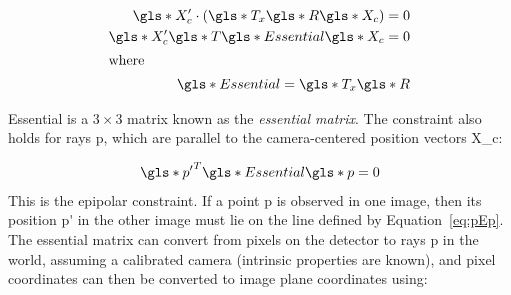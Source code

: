 \documentclass{osa-article}
\begin{document}
\begin{align}
  \gls*{X_c'} \cdot (\gls*{T_x} \gls*{R}\gls*{X_c}) = 0 \\
  \gls*{X_c'} \gls*{T} \gls*{Essential} \gls*{X_c}= 0   \\
  \intertext{where}
  \gls*{Essential} = \gls*{T_x} \gls*{R}
\end{align}

\gls*{Essential} is a \(3 \times 3\) matrix known as the \emph{essential matrix}.
The constraint also holds for rays \gls*{p}, which are parallel to the camera-centered position vectors \gls*{X_c}:

\begin{align}
  \gls*{p'}^T \gls*{Essential} \gls*{p} = 0 \label{eq:pEp}
\end{align}
This is the epipolar constraint.
If a point \gls*{p} is observed in one image, then its position \gls*{p'} in the other image must lie on the line defined by Equation~\eqref{eq:pEp}.
The essential matrix can convert from pixels on the detector to rays \gls*{p} in the world, assuming a calibrated camera (intrinsic properties are known), and pixel coordinates can then be converted to image plane coordinates using:
\end{document}
